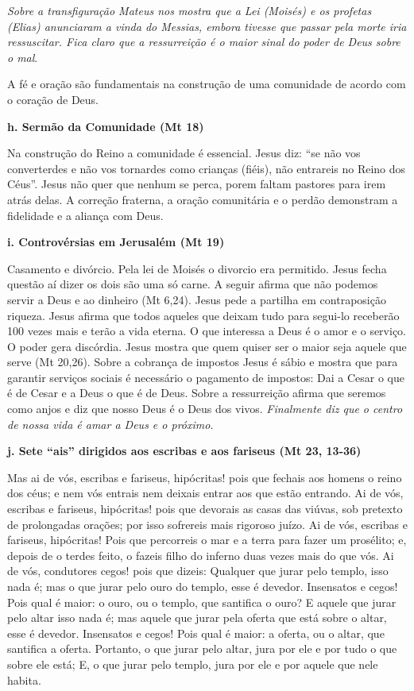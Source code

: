 \documentclass[
]{book}
\begin{document}
\emph{Sobre a transfiguração Mateus nos mostra que a Lei (Moisés) e os profetas (Elias) anunciaram a vinda do Messias, embora tivesse que passar pela morte iria ressuscitar. Fica claro que a ressurreição é o maior sinal do poder de Deus sobre o mal}.

A fé e oração são fundamentais na construção de uma comunidade de acordo com o coração de Deus.

\textbf{h. Sermão da Comunidade (Mt 18)}

Na construção do Reino a comunidade é essencial. Jesus diz: ``se não vos converterdes e não vos tornardes como crianças (fiéis), não entrareis no Reino dos Céus''. Jesus não quer que nenhum se perca, porem faltam pastores para irem atrás delas. A correção fraterna, a oração comunitária e o perdão demonstram a fidelidade e a aliança com Deus.

\textbf{i. Controvérsias em Jerusalém (Mt 19)}

Casamento e divórcio. Pela lei de Moisés o divorcio era permitido. Jesus fecha questão aí dizer os dois são uma só carne. A seguir afirma que não podemos servir a Deus e ao dinheiro (Mt 6,24). Jesus pede a partilha em contraposição riqueza. Jesus afirma que todos aqueles que deixam tudo para segui-lo receberão 100 vezes mais e terão a vida eterna. O que interessa a Deus é o amor e o serviço. O poder gera discórdia. Jesus mostra que quem quiser ser o maior seja aquele que serve (Mt 20,26). Sobre a cobrança de impostos Jesus é sábio e mostra que para garantir serviços sociais é necessário o pagamento de impostos: Dai a Cesar o que é de Cesar e a Deus o que é de Deus. Sobre a ressurreição afirma que seremos como anjos e diz que nosso Deus é o Deus dos vivos. \emph{Finalmente diz que o centro de nossa vida é amar a Deus e o próximo}.

\textbf{j. Sete ``ais'' dirigidos aos escribas e aos fariseus (Mt 23, 13-36)}

Mas ai de vós, escribas e fariseus, hipócritas! pois que fechais aos homens o reino dos céus; e nem vós entrais nem deixais entrar aos que estão entrando. Ai de vós, escribas e fariseus, hipócritas! pois que devorais as casas das viúvas, sob pretexto de prolongadas orações; por isso sofrereis mais rigoroso juízo. Ai de vós, escribas e fariseus, hipócritas! Pois que percorreis o mar e a terra para fazer um prosélito; e, depois de o terdes feito, o fazeis filho do inferno duas vezes mais do que vós. Ai de vós, condutores cegos! pois que dizeis: Qualquer que jurar pelo templo, isso nada é; mas o que jurar pelo ouro do templo, esse é devedor. Insensatos e cegos! Pois qual é maior: o ouro, ou o templo, que santifica o ouro? E aquele que jurar pelo altar isso nada é; mas aquele que jurar pela oferta que está sobre o altar, esse é devedor. Insensatos e cegos! Pois qual é maior: a oferta, ou o altar, que santifica a oferta. Portanto, o que jurar pelo altar, jura por ele e por tudo o que sobre ele está; E, o que jurar pelo templo, jura por ele e por aquele que nele habita.
\end{document}

